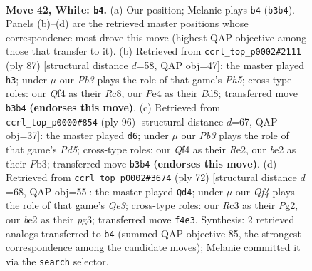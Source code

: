 \documentclass[11pt]{article}
\begin{document}
\clearpage

\begin{figure}[p]\centering
\begin{subfigure}{0.46\textwidth}\centering
\resizebox{\linewidth}{!}{%
\newchessgame
\chessboard[
  setfen={1k2r3/1p1n4/1r1p4/R7/4PQ2/1PR5/K3b1PP/8 w - - 1 42},
  showmover=false,
  pgfstyle=straightmove, color=movearrow, markmove={b3-b4}
]}
\caption{}
\end{subfigure}\hfill
\begin{subfigure}{0.46\textwidth}\centering
\resizebox{\linewidth}{!}{%
\newchessgame
\chessboard[
  setfen={2rb2k1/5p2/6p1/1PP3r1/2R4p/4N3/5P2/1R3K2 b - - 0 44},
  showmover=false,
  pgfstyle=straightmove, color=movearrow, markmove={h4-h3}
]}
\caption{}
\end{subfigure}
\\[4pt]
\begin{subfigure}{0.46\textwidth}\centering
\resizebox{\linewidth}{!}{%
\newchessgame
\chessboard[
  setfen={8/4r1kp/8/2pPr3/6P1/1P2pR1P/4R1K1/8 w - - 0 49},
  showmover=false,
  pgfstyle=straightmove, color=movearrow, markmove={d5-d6}
]}
\caption{}
\end{subfigure}\hfill
\begin{subfigure}{0.46\textwidth}\centering
\resizebox{\linewidth}{!}{%
\newchessgame
\chessboard[
  setfen={r3k3/3n2rp/P3p3/3b4/8/4QPp1/1P4P1/2R2K2 w - - 1 37},
  showmover=false,
  pgfstyle=straightmove, color=movearrow, markmove={e3-d4}
]}
\caption{}
\end{subfigure}
\caption{\textbf{Move 42, White: \texttt{b4}.} (a) Our position; Melanie plays \texttt{b4} (\texttt{b3b4}). Panels (b)--(d) are the retrieved master positions whose correspondence most drove this move (highest QAP objective among those that transfer to it). (b) Retrieved from \texttt{ccrl\_top\_p0002\#2111} (ply 87) [structural distance $d$=58, QAP obj=47]: the master played \texttt{h3}; under $\mu$ our \emph{Pb3} plays the role of that game's \emph{Ph5}; cross-type roles: our \emph{Q}f4 as their \emph{R}c8, our \emph{P}e4 as their \emph{B}d8; transferred move \texttt{b3b4} \textbf{(endorses this move)}. (c) Retrieved from \texttt{ccrl\_top\_p0000\#854} (ply 96) [structural distance $d$=67, QAP obj=37]: the master played \texttt{d6}; under $\mu$ our \emph{Pb3} plays the role of that game's \emph{Pd5}; cross-type roles: our \emph{Q}f4 as their \emph{R}e2, our \emph{b}e2 as their \emph{P}b3; transferred move \texttt{b3b4} \textbf{(endorses this move)}. (d) Retrieved from \texttt{ccrl\_top\_p0002\#3674} (ply 72) [structural distance $d$=68, QAP obj=55]: the master played \texttt{Qd4}; under $\mu$ our \emph{Qf4} plays the role of that game's \emph{Qe3}; cross-type roles: our \emph{R}c3 as their \emph{P}g2, our \emph{b}e2 as their \emph{p}g3; transferred move \texttt{f4e3}. Synthesis: 2 retrieved analogs transferred to \texttt{b4} (summed QAP objective 85, the strongest correspondence among the candidate moves); Melanie committed it via the \texttt{search} selector.}
\label{fig:thought-m82}
\end{figure}
\end{document}
